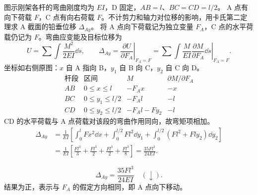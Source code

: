 \documentclass[a4paper,10pt,fontset=none]{ctexart}
\begin{document}
图示刚架各杆的弯曲刚度均为 $EI$，D 固定，$AB=l$、$BC=CD=l/2$。
A 点有向下荷载 $F$，C 点有向右荷载 $F$。不计剪力和轴力对位移的影响，用卡氏第二定理求 A 截面的铅垂位移 $\Delta_{Ay}$。
将 A 点向下荷载记为独立变量 $F_A$，C 点的水平荷载仍记为 $F$。弯曲应变能及目标位移为
\[
U=\sum\int\frac{M^2}{2EI}\dd s,\qquad
\Delta_{Ay}=\left.\frac{\partial U}{\partial F_A}\right|_{F_A=F}
=\left.\sum\int\frac{M}{EI}\frac{\partial M}{\partial F_A}\dd s\right|_{F_A=F}.
\]
坐标如右侧原图：$x$ 自 A 指向 B，$y_1$ 自 B 向 C，$y_2$ 自 C 向 D。
\[
\begin{array}{ccll}
\text{杆段}&\text{区间}&M&\partial M/\partial F_A\\\hline
AB&0\le x\le l&-F_Ax&-x\\
BC&0\le y_1\le l/2&-F_Al&-l\\
CD&0\le y_2\le l/2&-F_Al-Fy_2&-l
\end{array}
\]
CD 的水平荷载与 A 点荷载对该段的弯曲作用同向，故弯矩项相加。
\[
\begin{aligned}
\Delta_{Ay}
&=\frac1{EI}\left[\int_0^l Fx^2\dd x
+\int_0^{l/2}Fl^2\dd y_1
+\int_0^{l/2}(Fl^2+Fly_2)\dd y_2\right]\\
&=\frac1{EI}\left[\frac{Fl^3}{3}+\frac{Fl^3}{2}
+\frac{Fl^3}{2}+\frac{Fl^3}{8}\right]
=\frac{35Fl^3}{24EI}.
\end{aligned}
\]
\begin{answerbox}
\[
\boxed{\Delta_{Ay}=\frac{35Fl^3}{24EI}\quad(\downarrow)}.
\]
结果为正，表示与 $F_A$ 的假定方向相同，即 A 点向下移动。
\end{answerbox}
\end{document}
